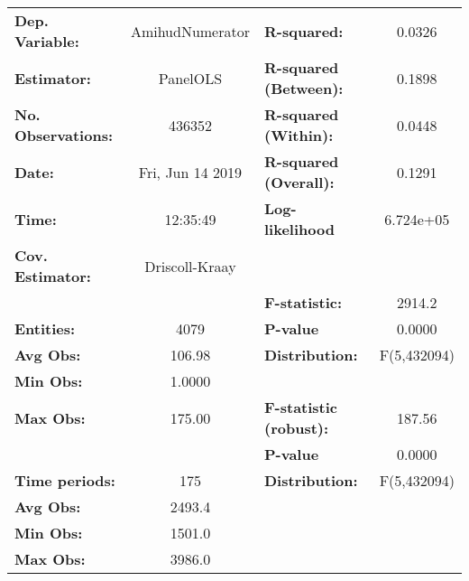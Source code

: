 \begin{center}
\begin{tabular}{lclc}
\toprule
\textbf{Dep. Variable:}                 &  AmihudNumerator   & \textbf{  R-squared:         }   &      0.0326      \\
\textbf{Estimator:}                     &      PanelOLS      & \textbf{  R-squared (Between):}  &      0.1898      \\
\textbf{No. Observations:}              &       436352       & \textbf{  R-squared (Within):}   &      0.0448      \\
\textbf{Date:}                          &  Fri, Jun 14 2019  & \textbf{  R-squared (Overall):}  &      0.1291      \\
\textbf{Time:}                          &      12:35:49      & \textbf{  Log-likelihood     }   &    6.724e+05     \\
\textbf{Cov. Estimator:}                &   Driscoll-Kraay   & \textbf{                     }   &                  \\
\textbf{}                               &                    & \textbf{  F-statistic:       }   &      2914.2      \\
\textbf{Entities:}                      &        4079        & \textbf{  P-value            }   &      0.0000      \\
\textbf{Avg Obs:}                       &       106.98       & \textbf{  Distribution:      }   &   F(5,432094)    \\
\textbf{Min Obs:}                       &       1.0000       & \textbf{                     }   &                  \\
\textbf{Max Obs:}                       &       175.00       & \textbf{  F-statistic (robust):} &      187.56      \\
\textbf{}                               &                    & \textbf{  P-value            }   &      0.0000      \\
\textbf{Time periods:}                  &        175         & \textbf{  Distribution:      }   &   F(5,432094)    \\
\textbf{Avg Obs:}                       &       2493.4       & \textbf{                     }   &                  \\
\textbf{Min Obs:}                       &       1501.0       & \textbf{                     }   &                  \\
\textbf{Max Obs:}                       &       3986.0       & \textbf{                     }   &                  \\

\end{tabular}
\end{center}
